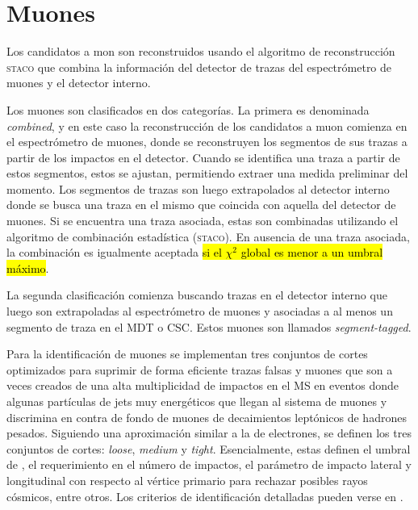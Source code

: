 \section{Muones}
\label{sec:muon_obj}

Los candidatos a mon son reconstruidos usando el algoritmo de reconstrucción
\textsc{staco}\cite{ATLAS_TDR1} que combina la información del detector de
trazas del espectrómetro de muones y el detector interno.

Los muones son clasificados en dos categorías. La primera es denominada
\emph{combined}, y en este caso la reconstrucción de los candidatos a muon
comienza en el espectrómetro de muones, donde se reconstruyen
los segmentos de sus trazas a partir de los impactos en el detector.
Cuando se identifica una traza a partir de estos segmentos, estos se ajustan,
permitiendo extraer una medida preliminar del momento. Los segmentos de trazas
son luego extrapolados al detector interno donde se busca una traza en el mismo
que coincida con aquella del detector de muones.
Si se encuentra una traza asociada, estas son combinadas utilizando el algoritmo
de combinación estadística (\textsc{staco}). En ausencia de una traza asociada,
la combinación es igualmente aceptada \hl{si el $\chi^2$ global es menor a un umbral
máximo}.

La segunda clasificación comienza buscando trazas en el detector interno que
luego son extrapoladas al espectrómetro de muones y asociadas a al menos un
segmento de traza en el MDT o CSC. Estos muones son llamados
\emph{segment-tagged}.

Para la identificación de muones se implementan tres conjuntos de cortes
optimizados para suprimir de forma eficiente trazas falsas y muones que son a
veces creados de una alta multiplicidad de impactos en el MS en eventos donde
algunas partículas de jets muy energéticos que llegan al sistema de muones y
discrimina en contra de fondo de muones de decaimientos leptónicos de hadrones
pesados. Siguiendo una aproximación similar a la de electrones, se
definen los tres conjuntos de cortes: \emph{loose}, \emph{medium} y \emph{tight}.
Esencialmente, estas definen el umbral de {\pt}, el requerimiento en el número
de impactos, el parámetro de impacto lateral y longitudinal con respecto al
vértice primario para rechazar posibles rayos cósmicos, entre otros. Los
criterios de identificación detalladas pueden verse en \cite{MuonEff}.


